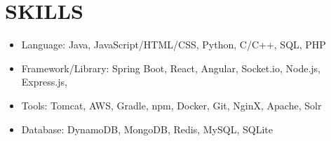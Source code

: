 \section{SKILLS}
\begin{itemize}
    \item Language: Java, JavaScript/HTML/CSS, Python, C/C++, SQL, PHP
    \item Framework/Library: Spring Boot, React, Angular, Socket.io, Node.js, Express.js, 
    \item Tools: Tomcat, AWS, Gradle, npm, Docker, Git, NginX, Apache, Solr
    \item Database: DynamoDB, MongoDB, Redis, MySQL, SQLite
\end{itemize}